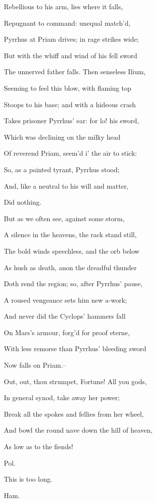 \documentclass[12pt]{book}
\begin{document}
   Rebellious to his arm, lies where it falls,

   Repugnant to command: unequal match'd,

   Pyrrhus at Priam drives; in rage strikes wide;

   But with the whiff and wind of his fell sword

   The unnerved father falls. Then senseless Ilium,

   Seeming to feel this blow, with flaming top

   Stoops to his base; and with a hideous crash

   Takes prisoner Pyrrhus' ear: for lo! his sword,

   Which was declining on the milky head

   Of reverend Priam, seem'd i' the air to stick:

   So, as a painted tyrant, Pyrrhus stood;

   And, like a neutral to his will and matter,

   Did nothing.

   But as we often see, against some storm,

   A silence in the heavens, the rack stand still,

   The bold winds speechless, and the orb below

   As hush as death, anon the dreadful thunder

   Doth rend the region; so, after Pyrrhus' pause,

   A roused vengeance sets him new a-work;

   And never did the Cyclops' hammers fall

   On Mars's armour, forg'd for proof eterne,

   With less remorse than Pyrrhus' bleeding sword

   Now falls on Priam.--

   Out, out, thou strumpet, Fortune! All you gods,

   In general synod, take away her power;

   Break all the spokes and fellies from her wheel,

   And bowl the round nave down the hill of heaven,

   As low as to the fiends!



Pol.

This is too long.



Ham.
\end{document}
